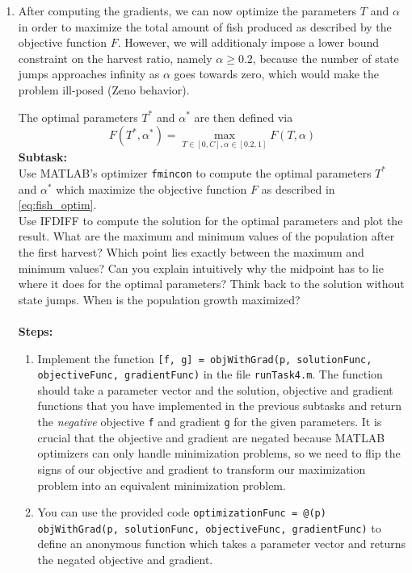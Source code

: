 \begin{enumerate}[label=\alph*)]
    \item After computing the gradients, we can now optimize the parameters $T$ and $\alpha$ in order to maximize the total amount of fish produced as described by the objective function $F$. However, we will additionaly impose a lower bound constraint on the harvest ratio, namely $\alpha \geq 0.2$, because the number of state jumps approaches infinity as $\alpha$ goes towards zero, which would make the problem ill-posed (Zeno behavior).
     
    The optimal parameters $T^*$ and $\alpha^*$ are then defined via
    \begin{equation}\label{eq:fish_optim}
       F(T^*, \alpha^*) = \max_{T \in [0, C], \alpha \in [0.2, 1]} F(T, \alpha)
    \end{equation}
    \textbf{Subtask:} \\
    Use MATLAB's optimizer \lstinline|fmincon| to compute the optimal parameters $T^*$ and $\alpha^*$ which maximize the objective function $F$ as described in \cref{eq:fish_optim}. \\
    Use IFDIFF to compute the solution for the optimal parameters and plot the result. What are the maximum and minimum values of the population after the first harvest? Which point lies exactly between the maximum and minimum values? Can you explain intuitively why the midpoint has to lie where it does for the optimal parameters? Think back to the solution without state jumps. When is the population growth maximized? \\ \\
    \textbf{Steps:}
    \begin{enumerate}[label=\arabic*.]
        \item Implement the function \lstinline|[f, g] = objWithGrad(p, solutionFunc, objectiveFunc, gradientFunc)| in the file \texttt{runTask4.m}. The function should take a parameter vector and the solution, objective and gradient functions that you have implemented in the previous subtasks and return the \textit{negative} objective \lstinline|f| and gradient \lstinline|g| for the given parameters. It is crucial that the objective and gradient are negated because MATLAB optimizers can only handle minimization problems, so we need to flip the signs of our objective and gradient to transform our maximization problem into an equivalent minimization problem.
        \item You can use the provided code \lstinline|optimizationFunc = @(p) objWithGrad(p, solutionFunc, objectiveFunc, gradientFunc)| to define an anonymous function which takes a parameter vector and returns the negated objective and gradient.

\end{enumerate}
\end{enumerate}
